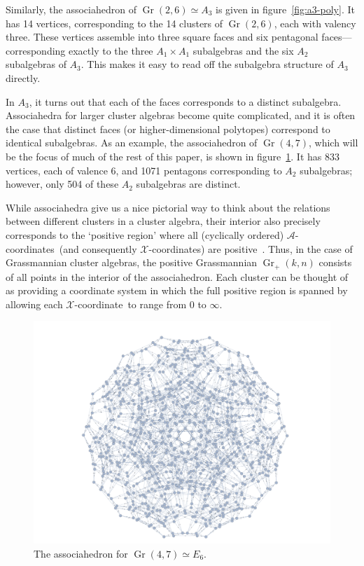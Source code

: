 \documentclass[12pt]{article}
\DeclareMathOperator{\Gr}{Gr}
\def\xcoord{$\mathcal{X}$-coordinate}
\def\xcoords{$\mathcal{X}$-coordinates}
\def\acoords{$\mathcal{A}$-coordinates}
\begin{document}
Similarly, the associahedron of $\Gr(2,6) \simeq A_3$ is given in figure~\ref{fig:a3-poly}. It has 14 vertices, corresponding to the 14 clusters of $\Gr(2,6)$, each with valency three. These vertices assemble into three square faces and six pentagonal faces---corresponding exactly to  the three $A_1 \times A_1$ subalgebras and the six $A_2$ subalgebras of $A_3$. This makes it easy to read off the subalgebra structure of $A_3$ directly. 

In $A_3$, it turns out that each of the faces corresponds to a distinct subalgebra. Associahedra for larger cluster algebras become quite complicated, and it is often the case that distinct faces (or higher-dimensional polytopes) correspond to identical subalgebras. As an example, the associahedron of $\Gr(4,7)$, which will be the focus of much of the rest of this paper, is shown in figure~\ref{fig:e6-poly}. It has 833 vertices, each of valence 6, and 1071 pentagons corresponding to $A_2$ subalgebras; however, only 504 of these $A_2$ subalgebras are distinct.

While associahedra give us a nice pictorial way to think about the relations between different clusters in a cluster algebra, their interior also precisely corresponds to the `positive region' where all (cyclically ordered) \acoords\ (and consequently \xcoords) are positive~\cite{ArkaniHamed:2012nw,Drummond:2018dfd}. Thus, in the case of Grassmannian cluster algebras, the positive Grassmannian $\Gr_+(k,n)$ consists of all points in the interior of the associahedron. Each cluster can be thought of as providing a coordinate system in which the full positive region is spanned by allowing each \xcoord\ to range from $0$ to $\infty$. 

\begin{figure}[t]  \centering
  \includegraphics[scale=0.25]{e6-associahedron}
  \caption{The associahedron for $\Gr(4,7) \simeq E_6$.}
  \label{fig:e6-poly}
\end{figure}
\end{document}
